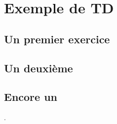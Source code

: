 \documentclass{book}
\begin{document}
\chapter{Exemple de TD}

\section{Un premier exercice}
\lipsum[1]

\correction{\lipsum[3]}

\section{Un deuxième}
\lipsum[1]

\section{Encore un}
\lipsum[2].
\end{document}
